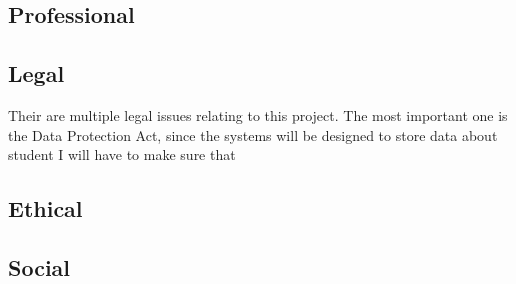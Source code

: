 \documentclass[12pt]{article}  %
\theoremstyle{definition}
\theoremstyle{remark}
\begin{document}
\subsection{Professional}

\subsection{Legal}
Their are multiple legal issues relating to this project. The most important one is the Data Protection Act, since the systems will be designed to store data about student I will have to make sure that 

\subsection{Ethical}

\subsection{Social}






%
%

\newpage
\end{document}
